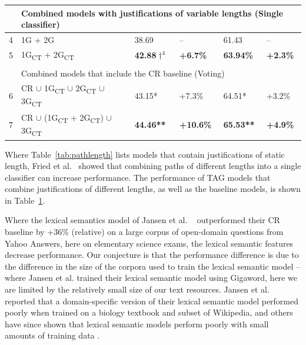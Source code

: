 {\begin{table}[t]
\begin{center}
\begin{tabular}{p{0.3mm}p{55mm}llll}
\\
\hline
& \multicolumn{5}{l}{Combined models with justifications of variable lengths (Single classifier)}\\
\hline
4 & 1G + 2G										& 38.69			& --		& 61.43  	& --  \\
5 & 1G\textsubscript{CT} + 2G\textsubscript{CT} 	& {\bf 42.88$\dagger ^4$}	& {\bf +6.7\%}		& {\bf 63.94\%}  	& {\bf +2.3\%}	  \\

\\
\hline
& \multicolumn{5}{l}{Combined models that include the CR baseline (Voting)}\\
\hline
6 & CR $\cup$ 1G\textsubscript{CT} $\cup$ 2G\textsubscript{CT} $\cup$ 3G\textsubscript{CT} 			& 43.15*			& +7.3\%			& 64.51*		& +3.2\%	  \\
7 & CR $\cup$ (1G\textsubscript{CT} + 2G\textsubscript{CT}) $\cup$ 3G\textsubscript{CT} 			& {\bf 44.46**}		& {\bf +10.6\%}		& {\bf 65.53**} 		& {\bf +4.9\%}	  \\

\hline
\end{tabular}
\vspace{-6mm}
\label{tab:combinedmodels}
\end{center}
\end{table}

Where Table~\ref{tab:pathlength} lists models that contain justifications of static length, Fried et al.~\citeyear{fried2015higher} showed that combining paths of different lengths into a single classifier can increase performance.  The performance of TAG models that combine justifications of different lengths, as well as the baseline models, is shown in Table~\ref{tab:combinedmodels}.

{} Where the lexical semantics model of Jansen et al. ~\citeyear{jansen14} outperformed their CR baseline by +36\% (relative) on a large corpus of open-domain questions from Yahoo Answers, here on elementary science exams, the lexical semantic features decrease performance.  Our conjecture is that the performance difference is due to the difference in the size of the corpora used to train the lexical semantic model -- where Jansen et al. trained their lexical semantic model using Gigaword, here we are limited by the relatively small size of our text resources.  Jansen et al. ~\citeyear{jansen14} reported that a domain-specific version of their lexical semantic model performed poorly when trained on a biology textbook and subset of Wikipedia, and others have since shown that lexical semantic models perform poorly with small amounts of training data \cite{sharp-EtAl:2015:NAACL-HLT}. 

}
